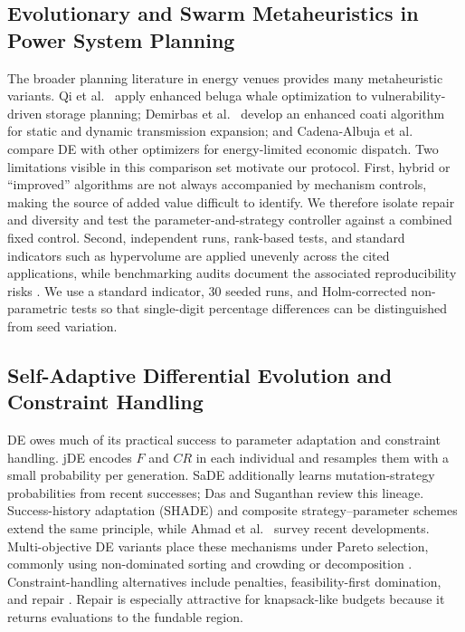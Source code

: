\documentclass[energies,article,submit,moreauthors]{Definitions/mdpi}
\begin{document}
\subsection{Evolutionary and Swarm Metaheuristics in Power System Planning}\label{evolutionary-and-swarm-metaheuristics-in-power-system-planning}

The broader planning literature in energy venues provides many metaheuristic variants. Qi et al.~\cite{ref17} apply enhanced beluga whale optimization to vulnerability-driven storage planning; Demirbas et al.~\cite{ref18} develop an enhanced coati algorithm for static and dynamic transmission expansion; and Cadena-Albuja et al.~\cite{ref19} compare DE with other optimizers for energy-limited economic dispatch. Two limitations visible in this comparison set motivate our protocol. First, hybrid or ``improved'' algorithms are not always accompanied by mechanism controls, making the source of added value difficult to identify. We therefore isolate repair and diversity and test the parameter-and-strategy controller against a combined fixed control. Second, independent runs, rank-based tests, and standard indicators such as hypervolume \cite{ref20} are applied unevenly across the cited applications, while benchmarking audits document the associated reproducibility risks \cite{ref4,ref21,ref22}. We use a standard indicator, 30 seeded runs, and Holm-corrected non-parametric tests so that single-digit percentage differences can be distinguished from seed variation.

\subsection{Self-Adaptive Differential Evolution and Constraint Handling}\label{self-adaptive-differential-evolution-and-constraint-handling}

DE \cite{ref1} owes much of its practical success to parameter adaptation and constraint handling. jDE \cite{ref2} encodes \(F\) and \(CR\) in each individual and resamples them with a small probability per generation. SaDE \cite{ref3} additionally learns mutation-strategy probabilities from recent successes; Das and Suganthan \cite{ref23} review this lineage. Success-history adaptation (SHADE) \cite{ref24} and composite strategy--parameter schemes \cite{ref25} extend the same principle, while Ahmad et al.~\cite{ref26} survey recent developments. Multi-objective DE variants place these mechanisms under Pareto selection, commonly using non-dominated sorting and crowding \cite{ref27} or decomposition \cite{ref28}. Constraint-handling alternatives include penalties, feasibility-first domination, and repair \cite{ref29,ref30}. Repair is especially attractive for knapsack-like budgets because it returns evaluations to the fundable region.
\end{document}
